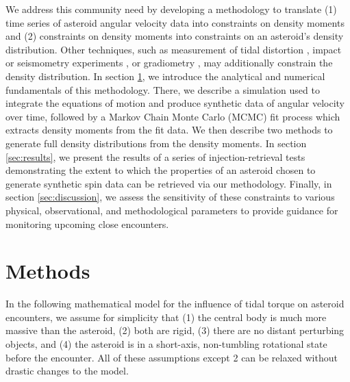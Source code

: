 \documentclass[fleqn,usenatbib]{mnras}
\begin{document}
We address this community need by developing a methodology to translate (1) time series of asteroid angular velocity data into constraints on density moments and (2) constraints on density moments into constraints on an asteroid's density distribution. Other techniques, such as measurement of tidal distortion \citep{RICHARDSON199847}, impact or seismometry experiments \citep{RICHARDSON2005325}, or gradiometry \citep{carroll2018tidal}, may additionally constrain the density distribution. In section \ref{sec:methods}, we introduce the analytical and numerical fundamentals of this methodology. There, we describe a simulation used to integrate the equations of motion and produce synthetic data of angular velocity over time, followed by a Markov Chain Monte Carlo (MCMC) fit process which  extracts density moments from the fit data. We then describe two methods to generate full density distributions from the density moments. In section \ref{sec:results}, we present the results of a series of injection-retrieval tests demonstrating the extent to which the properties of an asteroid chosen to generate synthetic spin data can be retrieved via our methodology. Finally, in section \ref{sec:discussion}, we assess the sensitivity of these constraints to various physical, observational, and methodological parameters to provide guidance for monitoring upcoming close encounters.





\section{Methods}
\label{sec:methods}

In the following mathematical model for the influence of tidal torque on asteroid encounters, we assume for simplicity that (1) the central body is much more massive than the asteroid, (2) both are rigid, (3) there are no distant perturbing objects, and (4) the asteroid is in a short-axis, non-tumbling rotational state before the encounter. All of these assumptions except 2 can be relaxed without drastic changes to the model.
\end{document}
